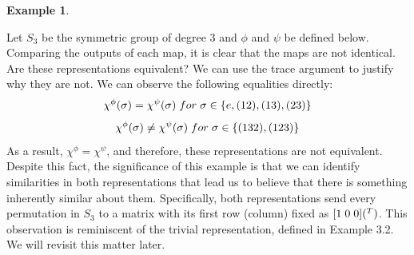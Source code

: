 \documentclass[10pt]{ucthesis}
\newtheorem{example}[definition]{Example}
\begin{document}
\begin{example}\end{example} 
	Let $S_3$ be the symmetric group of degree 3 and $\phi$ and $\psi$ be defined below. Comparing the outputs of each map, it is clear that the maps are not identical. Are these representations equivalent? We can use the trace argument to justify why they are not. We can observe the following equalities directly: 
$$\chi^{\phi}(\sigma) = \chi^{\psi}(\sigma) \hspace{1mm} for \hspace{1mm} \sigma \in \{e, (12), (13), (23)\}$$
$$\chi^{\phi}(\sigma) \neq \chi^{\psi}(\sigma) \hspace{1mm} for \hspace{1mm} \sigma \in \{(132), (123)\}$$
As a result, $\chi^{\phi} = \chi^{\psi}$, and therefore, these representations are not equivalent. Despite this fact, the significance of this example is that we can identify similarities in both representations that lead us to believe that there is something inherently similar about them. Specifically, both representations send every permutation in $S_3$ to a matrix with its first row (column) fixed as $[1 \hspace{1mm} 0 \hspace{1mm} 0](^T)$. This observation is reminiscent of the trivial representation, defined in Example 3.2. We will revisit this matter later.
\\
	\renewcommand{\arraystretch}{1.25}
\end{document}
